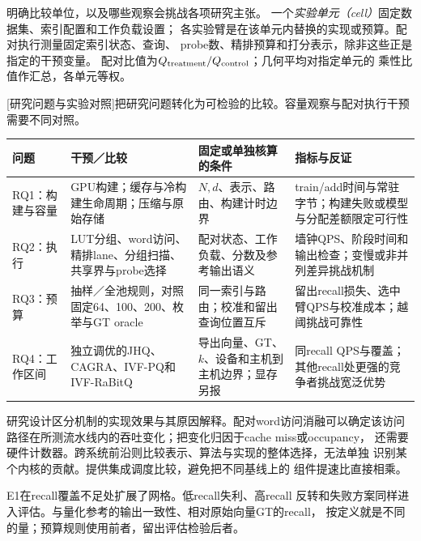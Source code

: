 明确比较单位，以及哪些观察会挑战各项研究主张。
一个\emph{实验单元（cell）}固定数据集、索引配置和工作负载设置；
各实验臂是在该单元内替换的实现或预算。配对执行测量固定索引状态、查询、
probe数、精排预算和打分表示，除非这些正是指定的干预变量。
配对比值为$Q_{\rm treatment}/Q_{\rm control}$；几何平均对指定单元的
乘性比值作汇总，各单元等权。

\par\medskip\noindent\begin{minipage}{\linewidth}
\centering\captionsetup{hypcap=false}
[研究问题与实验对照]{把研究问题转化为可检验的比较。容量观察与配对执行干预需要不同对照。}
\label{tab:3-design}
\footnotesize\setlength{\tabcolsep}{3pt}
\begin{tabularx}{\linewidth}{@{}p{.11\linewidth}XXX@{}}
\toprule
问题 & 干预／比较 & 固定或单独核算的条件 & 指标与反证 \\
\midrule
RQ1：构建与容量 & GPU构建；缓存与冷构建生命周期；压缩与原始存储
& $N,d$、表示、路由、构建计时边界
& train/add时间与常驻字节；构建失败或模型与分配差额限定可行性 \\
RQ2：执行 & LUT分组、word访问、精排lane、分组扫描、共享界与probe选择
& 配对状态、工作负载、分数及参考输出语义
& 墙钟QPS、阶段时间和输出检查；变慢或非并列差异挑战机制 \\
RQ3：预算 & 抽样／全池规则，对照固定64、100、200、枚举与GT oracle
& 同一索引与路由；校准和留出查询位置互斥
& 留出recall损失、选中臂QPS与校准成本；越阈挑战可靠性 \\
RQ4：工作区间 & 独立调优的JHQ、CAGRA、IVF-PQ和IVF-RaBitQ
& 导出向量、GT、$k$、设备和主机到主机边界；显存另报
& 同recall QPS与覆盖；其他recall处更强的竞争者挑战宽泛优势 \\
\bottomrule
\end{tabularx}
\end{minipage}\par\medskip

研究设计区分机制的实现效果与其原因解释。配对word访问消融可以确定该访问
路径在所测流水线内的吞吐变化；把变化归因于cache miss或occupancy，
还需要硬件计数器。跨系统前沿则比较表示、算法与实现的整体选择，无法单独
识别某个内核的贡献。提供集成调度比较，避免把不同基线上的
组件提速比直接相乘。

E1在recall覆盖不足处扩展了网格。低recall失利、高recall
反转和失败方案同样进入评估。与量化参考的输出一致性、相对原始向量GT的recall，
按定义就是不同的量；预算规则使用前者，留出评估检验后者。
